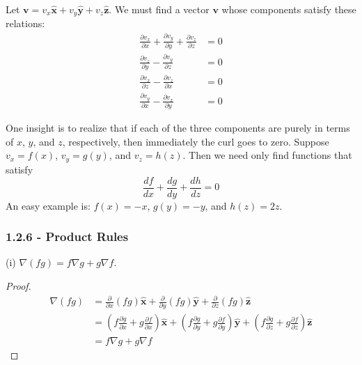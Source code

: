 \documentclass[a4paper]{article}
\begin{document}
\vspace{12pt}


Let \( \pmb{v} = v_{x}\pmb{\hat{x}} + v_{y}\pmb{\hat{y}} + v_{z}\pmb{\hat{z}} \). We must find a vector \( \pmb{v} \) whose components satisfy these relations:
\begin{align*}
	\frac{\partial v_{x}}{\partial x} + \frac{\partial v_{y}}{\partial y} + \frac{\partial v_{z}}{\partial z} & = 0 \\
	\frac{\partial v_{z}}{\partial y} - \frac{\partial v_{y}}{\partial z} & = 0 \\ 
	\frac{\partial v_{x}}{\partial z} - \frac{\partial v_{z}}{\partial x} & = 0 \\
	\frac{\partial v_{y}}{\partial x} - \frac{\partial v_{x}}{\partial y} & = 0
\end{align*}

One insight is to realize that if each of the three components are purely in terms of \( x \), \( y \), and \( z \), respectively, then immediately the curl goes to zero. Suppose \( v_{x} = f \!\left( x \right) \), \( v_{y} = g \!\left( y \right) \), and \( v_{z} = h \!\left( z \right) \). Then we need only find functions that satisfy
\[
	\frac{d f}{d x} + \frac{d g}{d y} + \frac{d h}{d z} = 0 
\]
An easy example is: \( f \!\left( x \right) = -x \), \( g \!\left( y \right) = -y \), and \( h \!\left( z \right) = 2z \).

\vspace{12pt}

\subsubsection{\textsf{1.2.6 - Product Rules}}

(i) \( \nabla \!\left( fg \right) = f \nabla g + g \nabla f \).
\begin{proof}[Proof]
\begin{align*}
	\nabla \!\left( fg \right) & = \frac{\partial }{\partial x}\!\left( fg \right)\pmb{\hat{x}} + \frac{\partial }{\partial y}\!\left( fg \right)\pmb{\hat{y}} + \frac{\partial }{\partial z}\!\left( fg \right)\pmb{\hat{z}} \\
	 & = \!\left( f \frac{\partial g}{\partial x} + g \frac{\partial f}{\partial x} \right)\pmb{\hat{x}} + \!\left( f \frac{\partial g}{\partial y} + g \frac{\partial f}{\partial y} \right)\pmb{\hat{y}} + \!\left( f \frac{\partial g}{\partial z} + g \frac{\partial f}{\partial z} \right)\pmb{\hat{z}} \\
	 & = f \nabla g + g \nabla f
\end{align*}
\end{proof}
\end{document}
